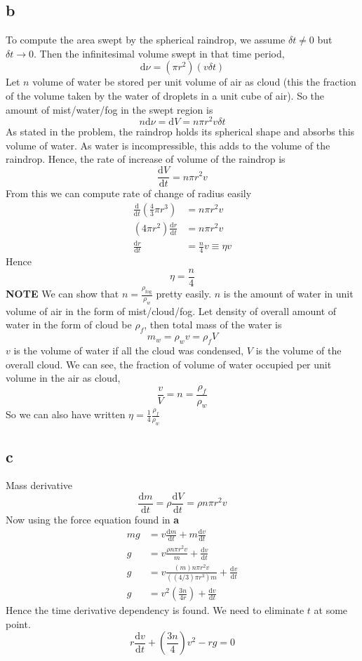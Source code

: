 \documentclass[letter]{article}
\begin{document}
\subsection{b}
To compute the area swept by the spherical raindrop, we assume $\delta t \neq 0 $ but $\delta t \to  0$. Then the infinitesimal volume swept in that time period, 
\[
\mathrm{d} \nu = 	\left(\pi r^2\right) \left(v \delta t\right)
\]
Let $n$ volume of water be stored per unit volume of air as cloud (this the fraction of the volume taken by the water of droplets in a unit cube of air). So the amount of mist/water/fog in the swept region is
\[
 n \mathrm{d} \nu = \mathrm{d} V = n \pi r^2 v \delta t 
\]
As stated in the problem, the raindrop holds its spherical shape and absorbs this volume of water. As water is incompressible, this adds to the volume of the raindrop. Hence, the rate of increase of volume of the raindrop is 
\[
	\frac{\mathrm{d} V}{\mathrm{d} t} = n \pi r^2 v
\]
From this we can compute rate of change of radius easily 
\begin{align*}
	\frac{\mathrm{d} }{\mathrm{d} t} \left(\frac{4}{3} \pi r^3\right) &= n \pi r^2 v \\
	(4 \pi r^2 )\frac{\mathrm{d} r}{\mathrm{d} t}&= n \pi r^2 v \\
	\frac{\mathrm{d} r}{\mathrm{d} t} &= \frac{n}{4} v \equiv \eta v
\end{align*}
Hence 
\[
\boxed{
\eta = \frac{n}{4}
}
\] 
\textbf{NOTE} We can show that $n = \frac{\rho_{\text{fog}}}{\rho_w}$ pretty easily. 
$n$ is the amount of water in unit volume of air in the form of mist/cloud/fog. Let density of overall amount of water in the form of cloud be $\rho_f$, then total mass of the water is 
\[
m_w = \rho_w v = \rho_f V
\]
$v$ is the volume of water if all the cloud was condensed, $V$ is the volume of the overall cloud. We can see, the fraction of volume of water occupied per unit volume in the air as cloud, 
\[
\frac{v}{V} = n = \frac{\rho_f}{\rho_w}
\]
So we can also have written $ \eta = \frac{1}{4} \frac{\rho_f}{\rho_w}$

\newpage 
\subsection{c} 
Mass derivative \[
\frac{\mathrm{d} m}{ \mathrm{d} t} = \rho \frac{\mathrm{d} V}{\mathrm{d} t} = \rho n \pi r^2 v
\]
Now using the force equation found in  \textbf{a}
\begin{align*}
	mg &= v \frac{\mathrm{d} m}{\mathrm{d} t} + m \frac{\mathrm{d} v}{\mathrm{d} t}\\
	g &= v \frac{\rho n \pi r^2 v}{m} + \frac{\mathrm{d} v}{\mathrm{d} t} \\
	g &= v \frac{(m) n \pi r^2 v}{ (( 4 / 3) \pi r^3) m } + \frac{\mathrm{d} v}{\mathrm{d} t} \\
	g &= v^2 \left(\frac{3n}{4r}\right) + \frac{\mathrm{d} v}{\mathrm{d} t} 
\end{align*}
Hence the time derivative dependency is found. We need to eliminate $t$ at some point. 
\[
	r \frac{\mathrm{d} v}{\mathrm{d} t} + \left(\frac{3n}{4}\right) v^2 - rg = 0
\] 
\end{document}
